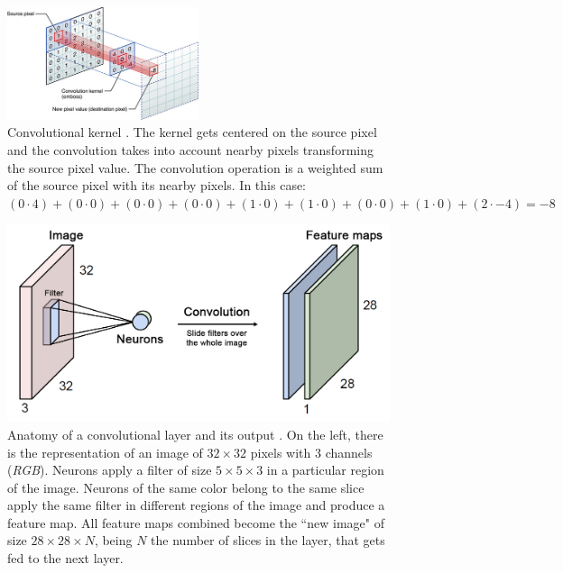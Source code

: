 \begin{figure}[htb]
  \begin{center}
    \includegraphics[width=0.5\textwidth]{gfx/kernel}
  \end{center}
  \caption{Convolutional kernel \cite{Apple}.
    The kernel gets centered on the source pixel and the convolution takes into account nearby pixels transforming the source pixel value.
    The convolution operation is a weighted sum of the source pixel with its nearby pixels. In this case:\\
    $(0\cdot4)+(0\cdot0)+(0\cdot0)
     +(0\cdot0)+(1\cdot0)+(1\cdot0)
     +(0\cdot0)+(1\cdot0)+(2\cdot-4) = -8$
  }
  \label{fig:sec:theory:covnets:kernel}
\end{figure}

\begin{figure}[htb]
  \includegraphics[width=\textwidth]{gfx/conv-layer-2}
  \caption{Anatomy of a convolutional layer and its output \cite{Guerzhoy2016}.
    On the left, there is the representation of an image of ${32}\times{32}$ pixels with $3$ channels (\emph{RGB}).
    Neurons apply a filter of size ${5}\times{5}\times{3}$ in a particular region of the image.
    Neurons of the same color belong to the same slice apply the same filter in different regions of the image and produce a feature map.
    All feature maps combined become the ``new image" of size ${28}\times{28}\times{N}$, being $N$ the number of slices in the layer, that gets fed to the next layer.}
  \label{fig:sec:theory:conv-layer-2}
\end{figure}

